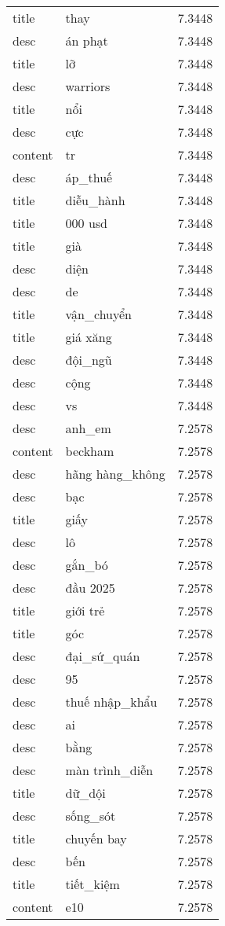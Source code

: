 \documentclass{article}
\begin{document}
\begin{tabular}{lll}
title & thay & 7.3448\\
desc & án phạt & 7.3448\\
title & lỡ & 7.3448\\
desc & warriors & 7.3448\\
title & nổi & 7.3448\\
desc & cực & 7.3448\\
content & tr & 7.3448\\
desc & áp\_thuế & 7.3448\\
title & diễu\_hành & 7.3448\\
title & 000 usd & 7.3448\\
title & già & 7.3448\\
desc & diện & 7.3448\\
desc & de & 7.3448\\
title & vận\_chuyển & 7.3448\\
title & giá xăng & 7.3448\\
desc & đội\_ngũ & 7.3448\\
desc & cộng & 7.3448\\
desc & vs & 7.3448\\
desc & anh\_em & 7.2578\\
content & beckham & 7.2578\\
desc & hãng hàng\_không & 7.2578\\
desc & bạc & 7.2578\\
title & giấy & 7.2578\\
desc & lô & 7.2578\\
desc & gắn\_bó & 7.2578\\
desc & đầu 2025 & 7.2578\\
title & giới trẻ & 7.2578\\
title & góc & 7.2578\\
desc & đại\_sứ\_quán & 7.2578\\
desc & 95 & 7.2578\\
desc & thuế nhập\_khẩu & 7.2578\\
desc & ai & 7.2578\\
desc & bằng & 7.2578\\
desc & màn trình\_diễn & 7.2578\\
title & dữ\_dội & 7.2578\\
desc & sống\_sót & 7.2578\\
title & chuyến bay & 7.2578\\
desc & bến & 7.2578\\
title & tiết\_kiệm & 7.2578\\
content & e10 & 7.2578\\

\end{tabular}
\end{document}

